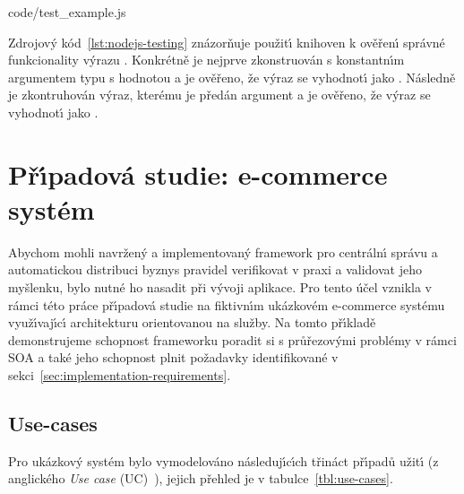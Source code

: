 
{code/test_example.js}

Zdrojov\'y kód~\ref{lst:nodejs-testing} znázorňuje použit\'{\i} knihoven k ověřen\'{\i} správné funkcionality v\'yrazu
. Konkrétně je nejprve zkonstruován s konstantn\'{\i}m argumentem typu 
s hodnotou  a je ověřeno, že v\'yraz se vyhodnot\'{\i} jako . Následně je zkontruhován
v\'yraz, kterému je předán argument  a je ověřeno, že v\'yraz se vyhodnot\'{\i} jako .

\section{Př\'{\i}padová studie: e-commerce systém}

Abychom mohli navržen\'y a implementovan\'y framework pro centráln\'{\i} správu
a automatickou distribuci byznys pravidel verifikovat v praxi a validovat
jeho myšlenku, bylo nutné ho nasadit při v\'yvoji aplikace.
Pro tento účel vznikla v rámci této práce př\'{\i}padová studie na fiktivn\'{\i}m
ukázkovém e-commerce systému využ\'{\i}vaj\'{\i}c\'{\i} architekturu orientovanou na služby.
Na tomto př\'{\i}kladě demonstrujeme schopnost frameworku poradit si s průřezov\'ymi
problémy v rámci \gls{SOA} a také jeho schopnost plnit požadavky identifikované v
sekci~\ref{sec:implementation-requirements}.

\subsection{Use-cases}

Pro ukázkov\'y systém bylo vymodelováno následuj\'{\i}c\'{\i}ch třináct př\'{\i}padů užit\'{\i}
(z anglického \textit{Use case} (\gls{UC})~\cite{bittner2002use}), jejich
přehled je v tabulce~\ref{tbl:use-cases}.

